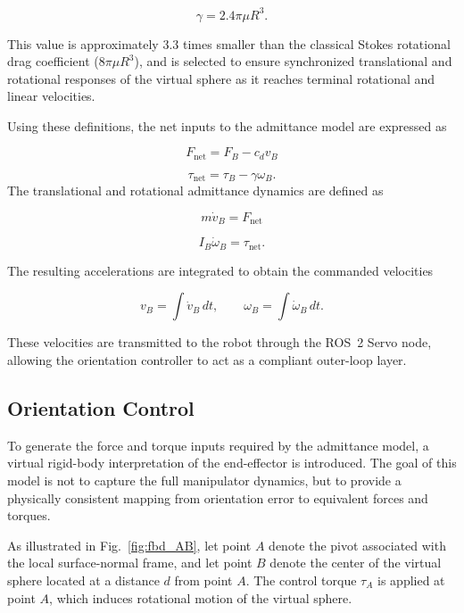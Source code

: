 \documentclass[journal]{IEEEtran}
\begin{document}
\begin{equation}
\gamma = 2.4\pi \mu R^3.
\end{equation}

This value is approximately $3.3$ times smaller than the classical Stokes rotational drag coefficient ($8\pi\mu R^3$), and is selected to ensure synchronized translational and rotational responses of the virtual sphere as it reaches terminal rotational and linear velocities.

Using these definitions, the net inputs to the admittance model are expressed as

\begin{equation}
F_{\mathrm{net}} = F_B - c_d v_B
\end{equation}

\begin{equation}
\tau_{\mathrm{net}} = \tau_B - \gamma \omega_B.
\end{equation}
The translational and rotational admittance dynamics are defined as

\begin{equation}
m \dot{v}_B = F_{\mathrm{net}}
\end{equation}

\begin{equation}
I_B \dot{\omega}_B = \tau_{\mathrm{net}}.
\end{equation}

The resulting accelerations are integrated to obtain the commanded velocities

\begin{equation}
v_B = \int \dot{v}_B \, dt, 
\qquad 
\omega_B = \int \dot{\omega}_B \, dt.
\end{equation}

These velocities are transmitted to the robot through the ROS~2 Servo node, allowing the orientation controller to act as a compliant outer-loop layer.
\subsection{Orientation Control}

To generate the force and torque inputs required by the admittance model, a virtual rigid-body interpretation of the end-effector is introduced. The goal of this model is not to capture the full manipulator dynamics, but to provide a physically consistent mapping from orientation error to equivalent forces and torques.

As illustrated in Fig.~\ref{fig:fbd_AB}, let point $A$ denote the pivot associated with the local surface-normal frame, and let point $B$ denote the center of the virtual sphere located at a distance $d$ from point $A$. The control torque $\tau_A$ is applied at point $A$, which induces rotational motion of the virtual sphere.
\end{document}
